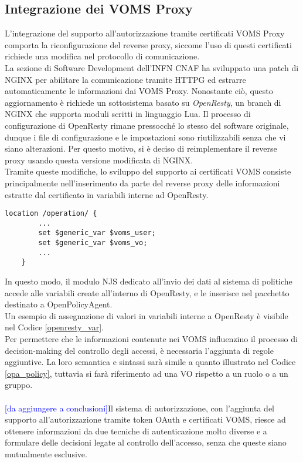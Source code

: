 \subsection{Integrazione dei VOMS Proxy}
L'integrazione del supporto all'autorizzazione tramite certificati VOMS Proxy comporta la riconfigurazione del reverse proxy, 
siccome l'uso di questi certificati richiede una modifica nel protocollo di comunicazione. 
\\ La sezione di Software Development dell'INFN CNAF ha sviluppato una patch di NGINX per abilitare la comunicazione tramite HTTPG ed estrarre automaticamente le informazioni dai VOMS Proxy.
Nonostante ciò, questo aggiornamento è richiede un sottosistema basato su \textit{OpenResty}, un branch di NGINX che supporta moduli scritti in linguaggio Lua. 
Il processo di configurazione di OpenResty
 rimane pressocché lo stesso del software originale, dunque i file di configurazione e le impostazioni sono riutilizzabili 
senza che vi siano alterazioni. Per questo motivo, si è deciso di reimplementare il reverse proxy usando questa versione modificata di NGINX. 
\\ Tramite queste modifiche, lo sviluppo del supporto ai certificati VOMS consiste principalmente nell'inserimento da parte del reverse proxy 
delle informazioni estratte dal certificato in variabili interne ad OpenResty. 

\begin{lstlisting}[caption={Assegnazione di variabili in OpenResty},captionpos=b,label=openresty_var]
    location /operation/ {
        ...
        set $generic_var $voms_user;
        set $generic_var $voms_vo;
        ...
    }
\end{lstlisting}
In questo modo, il modulo NJS dedicato all'invio dei dati al sistema di politiche accede alle variabili create all'interno di OpenResty, 
e le inserisce nel pacchetto destinato a OpenPolicyAgent. 
\\Un esempio di assegnazione di valori in variabili interne a 
OpenResty è visibile nel Codice \ref{openresty_var}.
\\ Per permettere che le informazioni contenute nei VOMS influenzino il processo di decision-making del controllo degli accessi,
 è necessaria l'aggiunta di regole aggiuntive. La loro semantica e sintassi sarà simile a quanto illustrato nel Codice \ref*{opa_policy},
tuttavia si farà riferimento ad una VO rispetto a un ruolo o a un gruppo.
\\ \\ \textcolor{blue}{[da aggiungere a conclusioni]}Il sistema di autorizzazione, con l'aggiunta del supporto all'autorizzazione tramite token OAuth e certificati VOMS, riesce ad ottenere informazioni 
da due tecniche di autenticazione molto diverse e a formulare delle decisioni legate al controllo dell'accesso, senza che queste siano mutualmente esclusive. 

